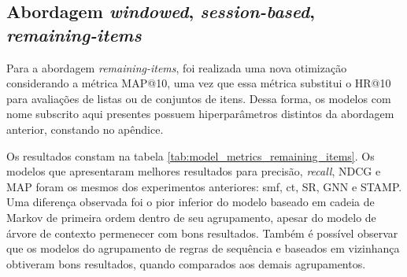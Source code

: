 \subsection{Abordagem \textit{windowed}, \textit{session-based}, \textit{remaining-items}}
Para a abordagem \textit{remaining-items}, foi realizada uma nova otimização
considerando a métrica MAP@10, uma vez que essa métrica substitui o HR@10 para
avaliações de listas ou de conjuntos de itens. Dessa forma, os modelos com nome subscrito aqui presentes possuem hiperparâmetros
distintos da abordagem anterior, constando no apêndice.

Os resultados constam na tabela \ref{tab:model_metrics_remaining_items}. Os modelos que apresentaram melhores resultados para precisão, \textit{recall},
NDCG e MAP foram os mesmos dos experimentos anteriores: smf, ct, SR, GNN e
STAMP. Uma diferença observada foi o pior inferior do modelo baseado em cadeia
de Markov de primeira ordem dentro de seu agrupamento, apesar do modelo de árvore de contexto permenecer
com bons resultados. Também é possível observar que os modelos do agrupamento
de regras de sequência e baseados em vizinhança obtiveram bons resultados, quando
comparados aos demais agrupamentos.


